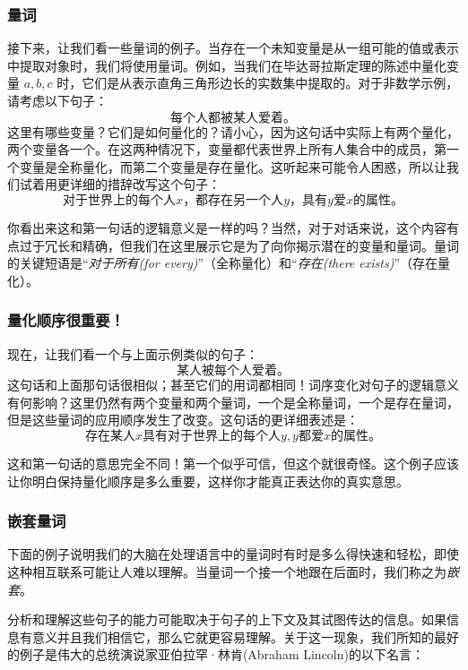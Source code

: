 \subsubsection*{量词}

接下来，让我们看一些量词的例子。当存在一个未知变量是从一组可能的值或表示中提取对象时，我们将使用量词。例如，当我们在毕达哥拉斯定理的陈述中量化变量 $a,b,c$ 时，它们是从表示直角三角形边长的实数集中提取的。对于非数学示例，请考虑以下句子：
\[\text{每个人都被某人爱着。}\]
这里有哪些变量？它们是如何量化的？请小心，因为这句话中实际上有两个量化，两个变量各一个。在这两种情况下，变量都代表世界上所有人集合中的成员，第一个变量是全称量化，而第二个变量是存在量化。这听起来可能令人困惑，所以让我们试着用更详细的措辞改写这个句子：
\[\text{对于世界上的每个人} x\text{，都存在另一个人} y \text{，具有} y \text{爱} x \text{的属性。}\]

你看出来这和第一句话的逻辑意义是一样的吗？当然，对于对话来说，这个内容有点过于冗长和精确，但我们在这里展示它是为了向你揭示潜在的变量和量词。量词的关键短语是``\emph{对于所有(for every)}''（全称量化）和``\emph{存在(there exists)}''（存在量化）。

\subsubsection*{量化顺序很重要！}

现在，让我们看一个与上面示例类似的句子：
\[\text{某人被每个人爱着。}\]
这句话和上面那句话很相似；甚至它们的用词都相同！词序变化对句子的逻辑意义有何影响？这里仍然有两个变量和两个量词，一个是全称量词，一个是存在量词，但是这些量词的应用顺序发生了改变。这句话的更详细表述是：
\[\text{存在某人} x \text{具有对于世界上的每个人} y, y \text{都爱} x \text{的属性。}\]

这和第一句话的意思完全不同！第一个似乎可信，但这个就很奇怪。这个例子应该让你明白保持量化顺序是多么重要，这样你才能真正表达你的真实意思。

\subsubsection*{嵌套量词}

下面的例子说明我们的大脑在处理语言中的量词时有时是多么得快速和轻松，即使这种相互联系可能让人难以理解。当量词一个接一个地跟在后面时，我们称之为\emph{嵌套}。

分析和理解这些句子的能力可能取决于句子的上下文及其试图传达的信息。如果信息有意义并且我们相信它，那么它就更容易理解。关于这一现象，我们所知的最好的例子是伟大的总统演说家亚伯拉罕·林肯(Abraham Lincoln)的以下名言：

